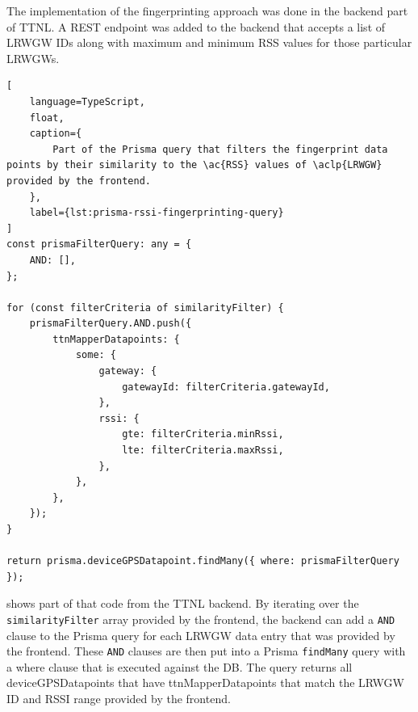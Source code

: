 The implementation of the fingerprinting approach was done in the backend part of \ac{TTNL}.
A \ac{REST} endpoint was added to the backend that accepts a list of \acl{LRWGW} IDs along with maximum and minimum \ac{RSS} values for those particular \aclp{LRWGW}.

\begin{lstlisting}[
    language=TypeScript,
    float,
    caption={
        Part of the Prisma query that filters the fingerprint data points by their similarity to the \ac{RSS} values of \aclp{LRWGW} provided by the frontend.
    },
    label={lst:prisma-rssi-fingerprinting-query}
]
const prismaFilterQuery: any = {
    AND: [],
};

for (const filterCriteria of similarityFilter) {
    prismaFilterQuery.AND.push({
        ttnMapperDatapoints: {
            some: {
                gateway: {
                    gatewayId: filterCriteria.gatewayId,
                },
                rssi: {
                    gte: filterCriteria.minRssi,
                    lte: filterCriteria.maxRssi,
                },
            },
        },
    });
}

return prisma.deviceGPSDatapoint.findMany({ where: prismaFilterQuery });
\end{lstlisting}

 shows part of that code from the \ac{TTNL} backend.
By iterating over the \lstinline|similarityFilter| array provided by the frontend, the backend can add a \lstinline|AND| clause to the Prisma query for each \acl{LRWGW} data entry that was provided by the frontend.
These \lstinline|AND| clauses are then put into a Prisma \lstinline|findMany| query with a where clause that is executed against the \ac{DB}.
The query returns all deviceGPSDatapoints that have ttnMapperDatapoints that match the \acl{LRWGW} ID and \ac{RSSI} range provided by the frontend.

